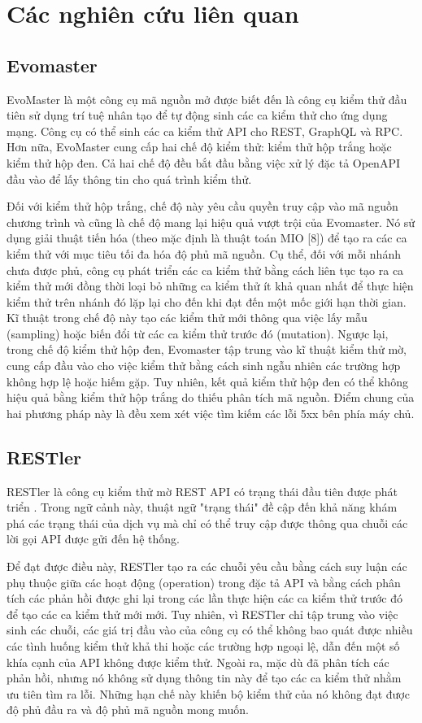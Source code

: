 \section{Các nghiên cứu liên quan}
\subsection{Evomaster}
EvoMaster là một công cụ mã nguồn mở được biết đến là công cụ kiểm thử  đầu tiên sử dụng trí tuệ nhân tạo để tự động sinh các ca kiểm thử cho ứng dụng mạng. Công cụ có thể sinh các ca kiểm thử API cho REST, GraphQL và RPC. Hơn nữa, EvoMaster cung cấp hai chế độ kiểm thử: kiểm thử hộp trắng  hoặc kiểm thử hộp đen. Cả hai chế độ đều bắt đầu bằng việc xử lý đặc tả OpenAPI đầu vào để lấy thông tin cho quá trình kiểm thử.

Đối với kiểm thử hộp trắng, chế độ này yêu cầu quyền truy cập vào mã nguồn chương trình và cũng là chế độ mang lại hiệu quả vượt trội của Evomaster. Nó sử dụng giải thuật tiến hóa (theo mặc định là thuật toán MIO [8]) để tạo ra các ca kiểm thử với mục tiêu tối đa hóa độ phủ mã nguồn. Cụ thể, đối với mỗi nhánh chưa được phủ, công cụ phát triển các ca kiểm thử  bằng cách liên tục tạo ra ca kiểm thử mới đồng thời loại bỏ những ca kiểm thử ít khả quan nhất  để thực hiện kiểm thử trên nhánh đó lặp lại cho đến khi đạt đến một mốc giới hạn thời gian. Kĩ thuật trong chế độ này tạo các kiểm thử mới thông qua việc lấy mẫu (sampling) hoặc biến đổi từ các ca kiểm thử trước đó (mutation). Ngược lại, trong chế độ kiểm thử hộp đen, Evomaster tập trung vào kĩ thuật kiểm thử mờ, cung cấp đầu vào cho việc kiểm thử bằng cách sinh ngẫu nhiên các trường hợp không hợp lệ hoặc hiếm gặp. Tuy nhiên, kết quả kiểm thử hộp đen có thể không hiệu quả bằng kiểm thử hộp trắng do thiếu phân tích mã nguồn. Điểm chung của hai phương pháp này là đều xem xét việc tìm kiếm các lỗi 5xx bên phía máy chủ.
\subsection{RESTler}
RESTler là công cụ kiểm thử mờ REST API có trạng thái đầu tiên được phát triển \cite{atlidakis2019restler}. Trong ngữ cảnh này, thuật ngữ "trạng thái" đề cập đến khả năng khám phá các trạng thái của dịch vụ mà chỉ có thể truy cập được thông qua chuỗi các lời gọi API được gửi đến hệ thống.

Để đạt được điều này, RESTler tạo ra các chuỗi yêu cầu bằng cách suy luận các phụ thuộc  giữa các
hoạt động (operation) trong đặc tả API và bằng cách phân tích các phản hồi được ghi lại trong các lần thực hiện các ca kiểm thử trước đó để tạo các ca kiểm thử mới mới. Tuy nhiên, vì RESTler chỉ tập trung vào việc sinh các chuỗi, các giá trị đầu vào của công cụ có thể không bao quát được nhiều các tình huống kiểm thử khả thi hoặc các trường hợp ngoại lệ, dẫn đến một số khía cạnh của API không được kiểm thử. Ngoài ra, mặc dù đã phân tích các phản hồi, nhưng nó không sử dụng thông tin này để tạo các ca kiểm thử nhằm ưu tiên tìm ra lỗi. Những hạn chế này khiến bộ kiểm thử của nó không đạt được độ phủ đầu ra và độ phủ mã nguồn mong muốn.

